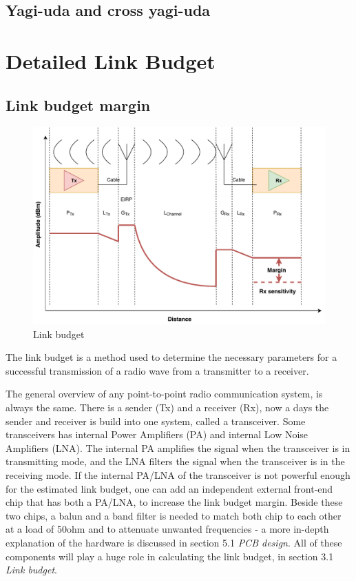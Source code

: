 \subsection{Yagi-uda and cross yagi-uda}

\section{Detailed Link Budget}
\subsection{Link budget margin}
\begin{figure}[h]
\centering
\hspace*{-2cm}
\includegraphics[scale=1.1]{figures/link_budget.pdf}
\caption{Link budget}
\end{figure}

The link budget is a method used to determine the necessary parameters for a successful transmission of a radio wave from a transmitter to a receiver.  

The general overview of any point-to-point radio communication system, is always the same. There is a sender (Tx) and a receiver (Rx), now a days the sender and receiver is build into one system, called a transceiver. Some transceivers has internal Power Amplifiers (PA) and internal Low Noise Amplifiers (LNA). The internal PA amplifies the signal when the transceiver is in transmitting mode, and the LNA filters the signal when the transceiver is in the receiving mode. If the internal PA/LNA of the transceiver is not powerful enough for the estimated link budget, one can add an independent external front-end chip that has both a PA/LNA, to increase the link budget margin. Beside these two chips, a balun and a band filter is needed to match both chip to each other at a load of 50ohm and to attenuate unwanted frequencies - a more in-depth explanation of the hardware is discussed in section 5.1 \textit{PCB design}. All of these components will play a huge role in calculating the link budget, in section 3.1 \textit{Link budget}. 

